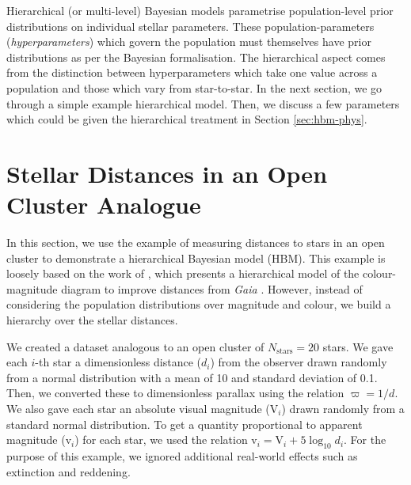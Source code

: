 Hierarchical (or multi-level) Bayesian models parametrise population-level prior distributions on individual stellar parameters. These population-parameters (\emph{hyperparameters}) which govern the population must themselves have prior distributions as per the Bayesian formalisation. The hierarchical aspect comes from the distinction between hyperparameters which take one value across a population and those which vary from star-to-star. In the next section, we go through a simple example hierarchical model. Then, we discuss a few parameters which could be given the hierarchical treatment in Section \ref{sec:hbm-phys}.

\section[Stellar Distances]{Stellar Distances in an Open Cluster Analogue}\label{sec:hbm-dist}

\newcommand{\appmag}{\ensuremath{\mathrm{v}}}
\newcommand{\absmag}{\ensuremath{\mathrm{V}}}

In this section, we use the example of measuring distances to stars in an open cluster to demonstrate a hierarchical Bayesian model (HBM). This example is loosely based on the work of \citet{Leistedt.Hogg2017}, which presents a hierarchical model of the colour-magnitude diagram to improve distances from \emph{Gaia} \citep{GaiaCollaboration.Prusti.ea2016}. However, instead of considering the population distributions over magnitude and colour, we build a hierarchy over the stellar distances.

We created a dataset analogous to an open cluster of \(N_\mathrm{stars}=20\) stars. We gave each \(i\)-th star a dimensionless distance (\(d_i\)) from the observer drawn randomly from a normal distribution with a mean of 10 and standard deviation of 0.1. Then, we converted these to dimensionless parallax using the relation \(\varpi = 1/d\). We also gave each star an absolute visual magnitude (\(\absmag_i\)) drawn randomly from a standard normal distribution. To get a quantity proportional to apparent magnitude (\(\appmag_i\)) for each star, we used the relation \(\appmag_i = \absmag_i + 5 \log_{10} d_i\). For the purpose of this example, we ignored additional real-world effects such as extinction and reddening.

%     

